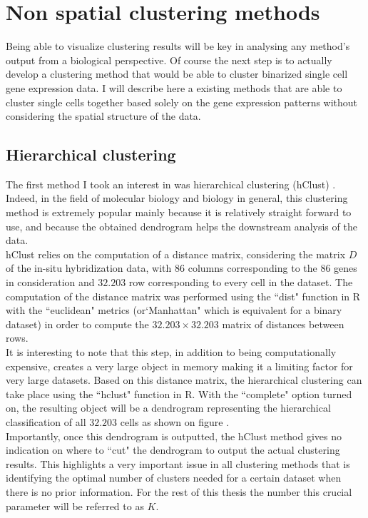 \section{Non spatial clustering methods}
Being able to visualize clustering results will be key in analysing any method's output from a biological perspective. Of course the next step is to actually develop a clustering method that would be able to cluster binarized single cell gene expression data. I will describe here a existing methods that are able to cluster single cells together based solely on the gene expression patterns without considering the spatial structure of the data.
	\subsection{Hierarchical clustering}
	The first method I took an interest in was hierarchical clustering (hClust) \cite{johnson67}. Indeed, in the field of molecular biology and biology in general, this clustering method is extremely popular mainly because it is relatively straight forward to use, and because the obtained dendrogram helps the downstream analysis of the data.\\
	
	hClust relies on the computation of a distance matrix, considering the matrix $D$ of the in-situ hybridization data, with $86$ columns corresponding to the 86 genes in consideration and $32.203$ row corresponding to every cell in the dataset. The computation of the distance matrix was performed using the ``dist" function in R with the ``euclidean" metrics (or`Manhattan" which is equivalent for a binary dataset) in order to compute the $32.203 \times 32.203$ matrix of distances between rows.\\
	
	It is interesting to note that this step, in addition to being computationally expensive, creates a very large object in memory making it a limiting factor for very large datasets. Based on this distance matrix, the hierarchical clustering can take place using the ``hclust" function in R. With the ``complete" option turned on, the resulting object will be a dendrogram  representing the hierarchical classification of all $32.203$ cells as shown on figure .\\
	
	Importantly, once this dendrogram is outputted, the hClust method gives no indication on where to ``cut" the dendrogram to output the actual clustering results. This highlights a very important issue in all clustering methods that is identifying the optimal number of clusters needed for a certain dataset when there is no prior information. For the rest of this thesis the number this crucial parameter will be referred to as $K$.\\
	
